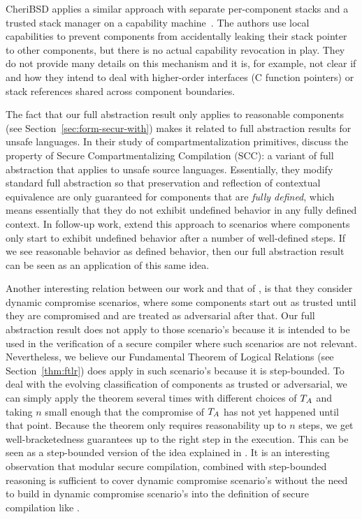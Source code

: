 \documentclass[acmsmall,screen]{acmart}\settopmatter{}
\begin{document}
CheriBSD applies a similar approach with separate per-component stacks and a trusted stack manager on a capability machine~\cite{watson_cheri_2015}.
The authors use local capabilities to prevent components from accidentally leaking their stack pointer to other components, but there is no actual capability revocation in play.
They do not provide many details on this mechanism and it is, for example, not clear if and how they intend to deal with higher-order interfaces (C function pointers) or stack references shared across component boundaries. 

The fact that our full abstraction result only applies to reasonable components (see Section~\ref{sec:form-secur-with}) makes it related to full abstraction results for unsafe languages.
In their study of compartmentalization primitives,  discuss the property of Secure Compartmentalizing Compilation (SCC): a variant of full abstraction that applies to unsafe source languages.
Essentially, they modify standard full abstraction so that preservation and reflection of contextual equivalence are only guaranteed for components that are {\itshape fully defined}, which means essentially that they do not exhibit undefined behavior in any fully defined context.
In follow-up work, \citet{Abate:2018:GCG:3243734.3243745} extend this approach to scenarios where components only start to exhibit undefined behavior after a number of well-defined steps. 
If we see reasonable behavior as defined behavior, then our full abstraction result can be seen as an application of this same idea.

Another interesting relation between our work and that of \citet{Abate:2018:GCG:3243734.3243745}, is that they consider dynamic compromise scenarios, where some components start out as trusted until they are compromised and are treated as adversarial after that.
Our full abstraction result does not apply to those scenario's because it is intended to be used in the verification of a secure compiler where such scenarios are not relevant.
Nevertheless, we believe our Fundamental Theorem of Logical Relations (see Section~\ref{thm:ftlr}) does apply in such scenario's because it is step-bounded.
To deal with the evolving classification of components as trusted or adversarial, we can simply apply the theorem several times with different choices of $T_{A}$ and taking $n$ small enough that the compromise of $T_{A}$ has not yet happened until that point. 
Because the theorem only requires reasonability up to $n$ steps, we get well-bracketedness guarantees up to the right step in the execution.
This can be seen as a step-bounded version of the idea explained in \cite{patrignani_modular_2016}.
It is an interesting observation that modular secure compilation, combined with step-bounded reasoning is sufficient to cover dynamic compromise scenario's without the need to build in dynamic compromise scenario's into the definition of secure compilation like \citet{Abate:2018:GCG:3243734.3243745}.
\end{document}
